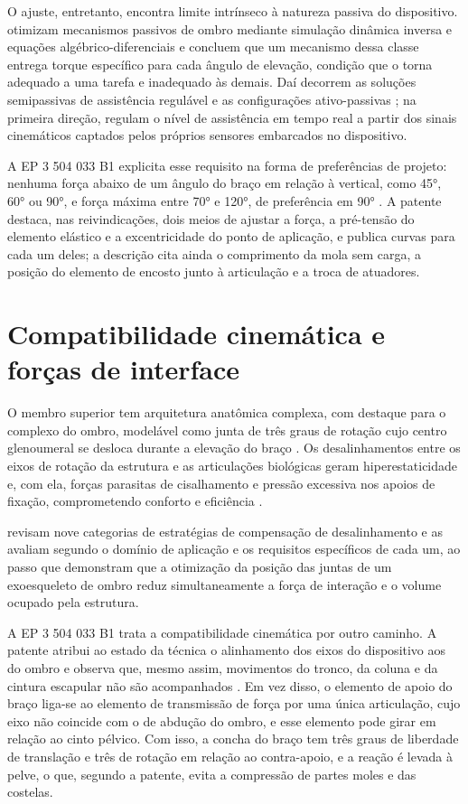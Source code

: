 O ajuste, entretanto, encontra limite intrínseco à natureza passiva do dispositivo. \textcite{nasr2022} otimizam mecanismos passivos de ombro mediante simulação dinâmica inversa e equações algébrico-diferenciais e concluem que um mecanismo dessa classe entrega torque específico para cada ângulo de elevação, condição que o torna adequado a uma tarefa e inadequado às demais. Daí decorrem as soluções semipassivas de assistência regulável \cite{grazi2020} e as configurações ativo-passivas \cite{nasr2023}; na primeira direção, \textcite{grazi2022} regulam o nível de assistência em tempo real a partir dos sinais cinemáticos captados pelos próprios sensores embarcados no dispositivo.

A EP 3 504 033 B1 explicita esse requisito na forma de preferências de projeto: nenhuma força abaixo de um ângulo do braço em relação à vertical, como 45°, 60° ou 90°, e força máxima entre 70° e 120°, de preferência em 90° \cite{mizera2023}. A patente destaca, nas reivindicações, dois meios de ajustar a força, a pré-tensão do elemento elástico e a excentricidade do ponto de aplicação, e publica curvas para cada um deles; a descrição cita ainda o comprimento da mola sem carga, a posição do elemento de encosto junto à articulação e a troca de atuadores.

\section{Compatibilidade cinemática e forças de interface}\label{sec:2.5}

O membro superior tem arquitetura anatômica complexa, com destaque para o complexo do ombro, modelável como junta de três graus de rotação cujo centro glenoumeral se desloca durante a elevação do braço \cite{gopura2009,shen2020}. Os desalinhamentos entre os eixos de rotação da estrutura e as articulações biológicas geram hiperestaticidade e, com ela, forças parasitas de cisalhamento e pressão excessiva nos apoios de fixação, comprometendo conforto e eficiência \cite{zeiaee2017}.

\textcite{naf2018} revisam nove categorias de estratégias de compensação de desalinhamento e as avaliam segundo o domínio de aplicação e os requisitos específicos de cada um, ao passo que \textcite{yoon2022} demonstram que a otimização da posição das juntas de um exoesqueleto de ombro reduz simultaneamente a força de interação e o volume ocupado pela estrutura.

A EP 3 504 033 B1 trata a compatibilidade cinemática por outro caminho. A patente atribui ao estado da técnica o alinhamento dos eixos do dispositivo aos do ombro e observa que, mesmo assim, movimentos do tronco, da coluna e da cintura escapular não são acompanhados \cite{mizera2023}. Em vez disso, o elemento de apoio do braço liga-se ao elemento de transmissão de força por uma única articulação, cujo eixo não coincide com o de abdução do ombro, e esse elemento pode girar em relação ao cinto pélvico. Com isso, a concha do braço tem três graus de liberdade de translação e três de rotação em relação ao contra-apoio, e a reação é levada à pelve, o que, segundo a patente, evita a compressão de partes moles e das costelas.

